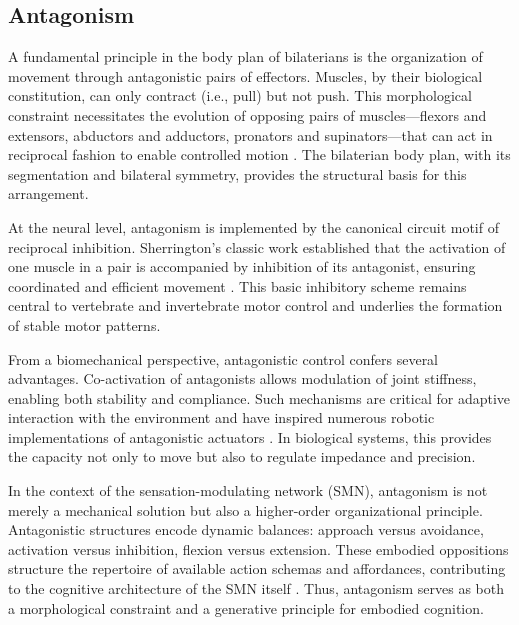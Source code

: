 \subsection{Antagonism}\label{antagonism}

A fundamental principle in the body plan of bilaterians is the organization of movement through antagonistic pairs of effectors. Muscles, by their biological constitution, can only contract (i.e., pull) but not push. This morphological constraint necessitates the evolution of opposing pairs of muscles—flexors and extensors, abductors and adductors, pronators and supinators—that can act in reciprocal fashion to enable controlled motion \cite{Huxley1932_RelativeGrowth,Schilling2011_AntagonisticEvolution}. The bilaterian body plan, with its segmentation and bilateral symmetry, provides the structural basis for this arrangement.

At the neural level, antagonism is implemented by the canonical circuit motif of reciprocal inhibition. Sherrington’s classic work established that the activation of one muscle in a pair is accompanied by inhibition of its antagonist, ensuring coordinated and efficient movement \cite{Sherrington1906_IntegrativeAction}. This basic inhibitory scheme remains central to vertebrate and invertebrate motor control and underlies the formation of stable motor patterns.

From a biomechanical perspective, antagonistic control confers several advantages. Co-activation of antagonists allows modulation of joint stiffness, enabling both stability and compliance. Such mechanisms are critical for adaptive interaction with the environment and have inspired numerous robotic implementations of antagonistic actuators \cite{Hogan1984_ImpedanceControl,Tondu2012_McKibbenMuscle}. In biological systems, this provides the capacity not only to move but also to regulate impedance and precision.

In the context of the sensation-modulating network (SMN), antagonism is not merely a mechanical solution but also a higher-order organizational principle. Antagonistic structures encode dynamic balances: approach versus avoidance, activation versus inhibition, flexion versus extension. These embodied oppositions structure the repertoire of available action schemas and affordances, contributing to the cognitive architecture of the SMN itself \cite{Bizzi2013_MuscleSynergies}. Thus, antagonism serves as both a morphological constraint and a generative principle for embodied cognition.

